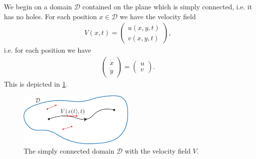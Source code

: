 \begin{ex}
	We begin on a domain $\mathcal{D}$ contained on the plane which is simply connected, i.e. it has no holes. For each position $x\in \mathcal{D}$ we have the velocity field
	\begin{align}
		{V}(x,t) = 
		\begin{pmatrix}
			u(x,y,t) \\ v(x,y,t)
		\end{pmatrix},
	\end{align}
	i.e. for each position we have
	 \begin{align}
		\begin{pmatrix}
			\dot{x} \\ \dot{y}
		\end{pmatrix}
		= 
		\begin{pmatrix}
			u \\v
		\end{pmatrix}
		.
	\end{align}
This is depicted in \ref{fig:incompressible}.
\begin{figure}[h!]
	\centering
	\includegraphics[width=0.5\textwidth]{figures/ch7/2_5simply_connected.pdf}
	\caption{The simply connected domain $\mathcal{D}$ with the velocity field $V$.}
	\label{fig:incompressible}
\end{figure}


\end{ex}
